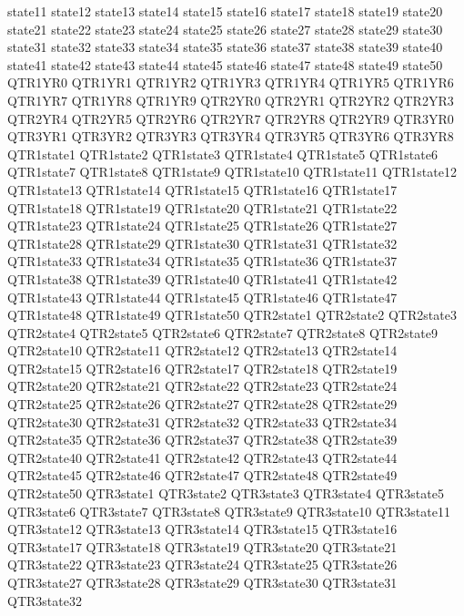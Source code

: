                state11 state12 state13 state14 state15 state16 state17
               state18 state19 state20 state21 state22 state23 state24
               state25 state26 state27 state28 state29 state30 state31
               state32 state33 state34 state35 state36 state37 state38
               state39 state40 state41 state42 state43 state44 state45
               state46 state47 state48 state49 state50 QTR1YR0 QTR1YR1
               QTR1YR2 QTR1YR3 QTR1YR4 QTR1YR5 QTR1YR6 QTR1YR7 QTR1YR8
               QTR1YR9 QTR2YR0 QTR2YR1 QTR2YR2 QTR2YR3 QTR2YR4 QTR2YR5
               QTR2YR6 QTR2YR7 QTR2YR8 QTR2YR9 QTR3YR0 QTR3YR1 QTR3YR2
               QTR3YR3 QTR3YR4 QTR3YR5 QTR3YR6 QTR3YR8 QTR1state1 QTR1state2
               QTR1state3 QTR1state4 QTR1state5 QTR1state6 QTR1state7
               QTR1state8 QTR1state9 QTR1state10 QTR1state11 QTR1state12
               QTR1state13 QTR1state14 QTR1state15 QTR1state16 QTR1state17
               QTR1state18 QTR1state19 QTR1state20 QTR1state21 QTR1state22
               QTR1state23 QTR1state24 QTR1state25 QTR1state26 QTR1state27
               QTR1state28 QTR1state29 QTR1state30 QTR1state31 QTR1state32
               QTR1state33 QTR1state34 QTR1state35 QTR1state36 QTR1state37
               QTR1state38 QTR1state39 QTR1state40 QTR1state41 QTR1state42
               QTR1state43 QTR1state44 QTR1state45 QTR1state46 QTR1state47
               QTR1state48 QTR1state49 QTR1state50 QTR2state1 QTR2state2
               QTR2state3 QTR2state4 QTR2state5 QTR2state6 QTR2state7
               QTR2state8 QTR2state9 QTR2state10 QTR2state11 QTR2state12
               QTR2state13 QTR2state14 QTR2state15 QTR2state16 QTR2state17
               QTR2state18 QTR2state19 QTR2state20 QTR2state21 QTR2state22
               QTR2state23 QTR2state24 QTR2state25 QTR2state26 QTR2state27
               QTR2state28 QTR2state29 QTR2state30 QTR2state31 QTR2state32
               QTR2state33 QTR2state34 QTR2state35 QTR2state36 QTR2state37
               QTR2state38 QTR2state39 QTR2state40 QTR2state41 QTR2state42
               QTR2state43 QTR2state44 QTR2state45 QTR2state46 QTR2state47
               QTR2state48 QTR2state49 QTR2state50 QTR3state1 QTR3state2
               QTR3state3 QTR3state4 QTR3state5 QTR3state6 QTR3state7
               QTR3state8 QTR3state9 QTR3state10 QTR3state11 QTR3state12
               QTR3state13 QTR3state14 QTR3state15 QTR3state16 QTR3state17
               QTR3state18 QTR3state19 QTR3state20 QTR3state21 QTR3state22
               QTR3state23 QTR3state24 QTR3state25 QTR3state26 QTR3state27
               QTR3state28 QTR3state29 QTR3state30 QTR3state31 QTR3state32
